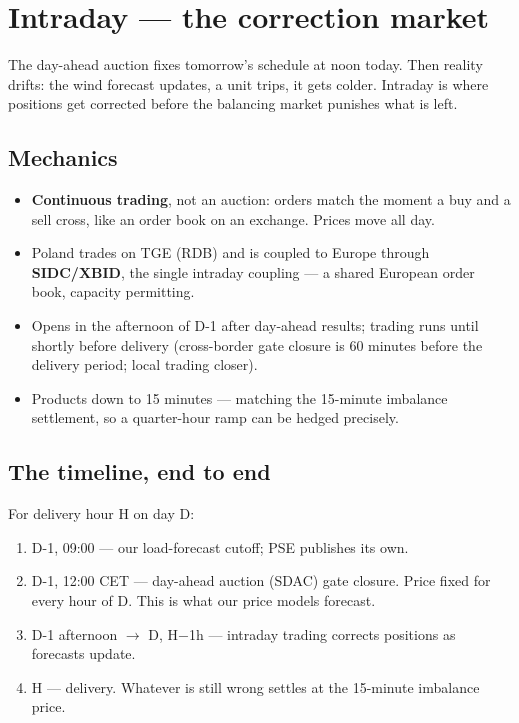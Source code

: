 \section{Intraday --- the correction market}

The day-ahead auction fixes tomorrow's schedule at noon today. Then
reality drifts: the wind forecast updates, a unit trips, it gets colder.
Intraday is where positions get corrected before the balancing market
punishes what is left.

\subsection{Mechanics}

\begin{itemize}
  \item \textbf{Continuous trading}, not an auction: orders match the
        moment a buy and a sell cross, like an order book on an exchange.
        Prices move all day.
  \item Poland trades on TGE (RDB) and is coupled to Europe through
        \textbf{SIDC/XBID}, the single intraday coupling --- a shared
        European order book, capacity permitting.
  \item Opens in the afternoon of D-1 after day-ahead results; trading
        runs until shortly before delivery (cross-border gate closure is
        60 minutes before the delivery period; local trading closer).
  \item Products down to 15 minutes --- matching the 15-minute imbalance
        settlement, so a quarter-hour ramp can be hedged precisely.
\end{itemize}

\subsection{The timeline, end to end}

For delivery hour H on day D:

\begin{enumerate}
  \item D-1, 09:00 --- our load-forecast cutoff; PSE publishes its own.
  \item D-1, 12:00 CET --- day-ahead auction (SDAC) gate closure.
        Price fixed for every hour of D. This is what our price models
        forecast.
  \item D-1 afternoon $\to$ D, H$-$1h --- intraday trading corrects
        positions as forecasts update.
  \item H --- delivery. Whatever is still wrong settles at the
        15-minute imbalance price.
\end{enumerate}

